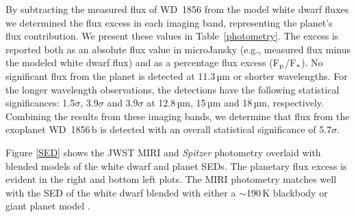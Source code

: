 \documentclass[twocolumn]{aastex631}
\begin{document}
By subtracting the measured flux of WD~1856 from the model white dwarf fluxes we determined the flux excess in each imaging band, representing the planet's flux contribution. We present these values in Table~\ref{photometry}. The excess is reported both as an absolute flux value in microJansky (e.g., measured flux minus the modeled white dwarf flux) and as a percentage flux excess (F$_{\rm p}$/F$_{\rm *}$). No significant flux from the planet is detected at 11.3\,µm or shorter wavelengths. For the longer wavelength observations, the detections have the following statistical significances: 1.5$\sigma$, 3.9$\sigma$ and 3.9$\sigma$ at 12.8\,µm, 15\,µm and 18\,µm, respectively. Combining the results from these imaging bands, we determine that flux from the exoplanet WD~1856\,b is detected with an overall statistical significance of 5.7$\sigma$. 





Figure \ref{SED} shows the JWST MIRI and \textit{Spitzer} \citep{Vanderburg_2020} photometry overlaid with blended models of the white dwarf and planet SEDs. The planetary flux excess is evident in the right and bottom left plots. The MIRI photometry matches well with the SED of the white dwarf blended with either a $\sim$190\,K blackbody or giant planet model \citep{Marley2021}.
\end{document}
